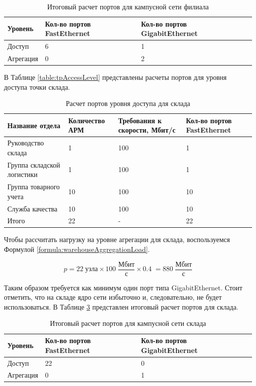 \documentclass[14pt, a4paper]{extarticle}
\numberwithin{equation}{section}
\begin{document}
\begin{table}[H]
\centering
\small
\caption{Итоговый расчет портов для кампусной сети филиала}
\begin{tabular}{|m{2cm}|m{4cm}|m{3cm}|m{3.5cm}|}
\hline
\textbf{Уровень} & \textbf{Кол-во портов FastEthernet} & \textbf{Кол-во портов GigabitEthernet} \\
\hline
Доступ & 6 & 1 \\
\hline
Агрегация & 0 & 2 \\
\hline
\end{tabular}
\label{table:filialCampusNet}
\end{table}


В Таблице \ref{table:tpAccessLevel} представлены расчеты портов для уровня доступа 
точки склада.

\begin{table}[H]
\centering
\small
\caption{Расчет портов уровня доступа для склада}
\begin{tabular}{|m{3cm}|m{2.5cm}|m{2.5cm}|m{2.5cm}|}
\hline
\textbf{Название отдела} & \textbf{Количество АРМ} & \textbf{Требования к скорости, Мбит/с} & \textbf{Кол-во портов FastEthernet} \\
\hline
Руководство склада & 1 & 100 & 1 \\
\hline
Группа складской логистики & 1 & 100 & 1 \\
\hline
Группа товарного учета & 10 & 100 & 10 \\
\hline
Служба качества & 10 & 100 & 10 \\
\hline
Итого & 22 & - & 22 \\
\hline
\end{tabular}
\label{table:warehouseAccessLevel}
\end{table}

Чтобы рассчитать нагрузку на уровне агрегации для 
склада, воспользуемся Формулой \ref{formula:warehouseAggregationLoad}.

\begin{equation}
p = 22 \; \text{узла} \times 100\;\frac{\text{Мбит}}{\text{с}} \times 0.4 \; = 880\;\frac{\text{Мбит}}{\text{с}}
\label{formula:warehouseAggregationLoad}
\end{equation}

Таким образом требуется как минимум один порт типа GigabitEthernet.
Стоит отметить, что на складе ядро сети избыточно и, 
следовательно, не будет использоваться.
В Таблице \ref{table:warehouseCampusNet} представлен итоговый расчет портов для склада.


\begin{table}[H]
\centering
\small
\caption{Итоговый расчет портов для кампусной сети склада}
\begin{tabular}{|m{2cm}|m{4cm}|m{3cm}|m{3.5cm}|}
\hline
\textbf{Уровень} & \textbf{Кол-во портов FastEthernet} & \textbf{Кол-во портов GigabitEthernet} \\
\hline
Доступ & 22 & 0 \\
\hline
Агрегация & 0 & 1 \\
\hline
\end{tabular}
\label{table:warehouseCampusNet}
\end{table}
\end{document}
